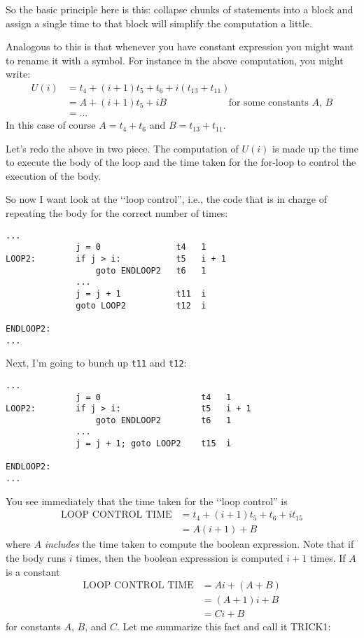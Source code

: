 So the basic principle here is this:
collapse chunks of statements into a block and assign
a single time to that block will simplify the computation
a little.

Analogous to this is that whenever you have constant expression
you might want to rename it with a symbol.
For instance in the above computation, you might write:
\begin{align*}
U(i) 
&= t_4 + (i + 1)t_5 + t_6 + i(t_{13} + t_{11}) \\
&= A + (i + 1)t_5 + iB \hspace{1in} \text{ for some constants $A$, $B$}\\
&= ...
\end{align*}
In this case of course $A = t_4 + t_6$ and $B = t_{13} + t_{11}$.



Let's redo the above in two piece.
The computation of $U(i)$ is made up the time to execute the
body of the loop and the time taken for the for-loop
to control the execution of the body.


So now I want look at the \lq\lq loop control'', i.e., the code that
is in charge of repeating the body for the correct number of times:
\begin{Verbatim}[frame=single, fontsize=\footnotesize]
...
              j = 0               t4   1
LOOP2:        if j > i:           t5   i + 1
                  goto ENDLOOP2   t6   1
              ...
              j = j + 1           t11  i
              goto LOOP2          t12  i

ENDLOOP2: 
...
\end{Verbatim}

Next, I'm going to bunch up \verb!t11! and \verb!t12!:
\begin{Verbatim}[frame=single, fontsize=\footnotesize]
...
              j = 0                    t4   1
LOOP2:        if j > i:                t5   i + 1
                  goto ENDLOOP2        t6   1
              ...
              j = j + 1; goto LOOP2    t15  i

ENDLOOP2: 
...
\end{Verbatim}
You see immediately that the time taken for the \lq\lq loop control''
is
\begin{align*}
\text{LOOP CONTROL TIME} 
&= 
t_4 + 
(i + 1) t_5 + 
t_6 + 
i t_{15}
\\
&= A(i+1) + B
\end{align*}
where $A$ \textit{ includes} 
the time taken to compute the boolean expression.
Note that if the body runs $i$ times, then the boolean
expresssion is computed $i + 1$ times.
If $A$ is a constant
\begin{align*}
\text{LOOP CONTROL TIME} 
&= Ai + (A + B) \\
&= (A + 1)i + B \\
&= Ci + B
\end{align*}
for constants $A$, $B$, and $C$.
Let me summarize this fact and call it TRICK1:



